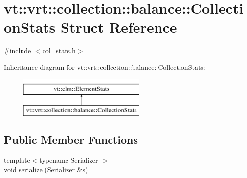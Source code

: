 \hypertarget{structvt_1_1vrt_1_1collection_1_1balance_1_1_collection_stats}{}\section{vt\+:\+:vrt\+:\+:collection\+:\+:balance\+:\+:Collection\+Stats Struct Reference}
\label{structvt_1_1vrt_1_1collection_1_1balance_1_1_collection_stats}


{\ttfamily \#include $<$col\+\_\+stats.\+h$>$}

Inheritance diagram for vt\+:\+:vrt\+:\+:collection\+:\+:balance\+:\+:Collection\+Stats\+:\begin{figure}[H]
\begin{center}
\leavevmode
\includegraphics[height=2.000000cm]{structvt_1_1vrt_1_1collection_1_1balance_1_1_collection_stats}
\end{center}
\end{figure}
\subsection*{Public Member Functions}
\begin{DoxyCompactItemize}
\item 
{\footnotesize template$<$typename Serializer $>$ }\\void \hyperlink{structvt_1_1vrt_1_1collection_1_1balance_1_1_collection_stats_a61b24fc4c39616beb6d84e875d46a16b}{serialize} (Serializer \&s)
\end{DoxyCompactItemize}
